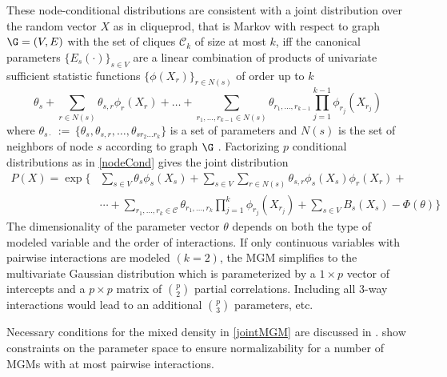 These node-conditional distributions are consistent with a joint distribution over the random vector $X$ as in cliqueprod, that is Markov with respect to graph $\G = (V,E)$ with the set of cliques $\mathcal{C}_{k}$ of size at most $k$, iff the canonical parameters $\{E_s (\cdot)\}_{s \in V}$ are a linear combination of products of univariate sufficient statistic functions $\{\phi (X_r)\}_{r \in N(s)}$ of order up to $k$
\begin{equation} \label{suffStat}
    \theta_s + \sum_{r \in N(s)} \theta_{s,r} \phi_{r} (X_r) + \ldots + \sum_{r_1, \ldots , r_{k-1} \in N(s)} \theta_{r_1, \ldots , r_{k-1}} \prod_{j=1}^{k-1} \phi_{r_j} (X_{r_j})
\end{equation}
where $\theta_{s \cdot} \, := \, \{ \theta_s , \theta_{s,r} , \ldots , \theta_{s r_2 \ldots r_k}\}$ is a set of parameters and $N(s)$ is the set of neighbors of node $s$ according to graph $\G$ \cite{yang2014mixed}. Factorizing $p$ conditional distributions as in \eqref{nodeCond} gives the joint distribution
\begin{equation} \label{jointMGM}
    \begin{split}
        P(X) = \exp\Bigg\{&\sum_{s \in V} \theta_s \phi_s (X_s) + \sum_{s \in V} \sum_{r \in N(s)} \theta_{s,r} \phi_s (X_s) \phi_r (X_r) + \\
        &\cdots + \sum_{r_1 , \ldots , r_k \in \mathcal{C}} \theta_{r_1 , \ldots , r_k} \prod_{j=1}^{k} \phi_{r_j} (X_{r_j}) + \sum_{s \in V} B_s (X_s) - \Phi (\theta) \Bigg\}
    \end{split}
\end{equation}
The dimensionality of the parameter vector $\theta$ depends on both the type of modeled variable and the order of interactions. If only continuous variables with pairwise interactions are modeled $(k=2)$, the MGM simplifies to the multivariate Gaussian distribution which is parameterized by a $1 \times p$ vector of intercepts and a $p \times p$ matrix of $\binom{p}{2}$ partial correlations. Including all 3-way interactions would lead to an additional $\binom{p}{3}$ parameters, etc. 

Necessary conditions for the mixed density in \eqref{jointMGM} are discussed in \cite{yang2014mixed}. \cite{chen2014selection} show constraints on the parameter space to ensure normalizability for a number of MGMs with at most pairwise interactions. 

